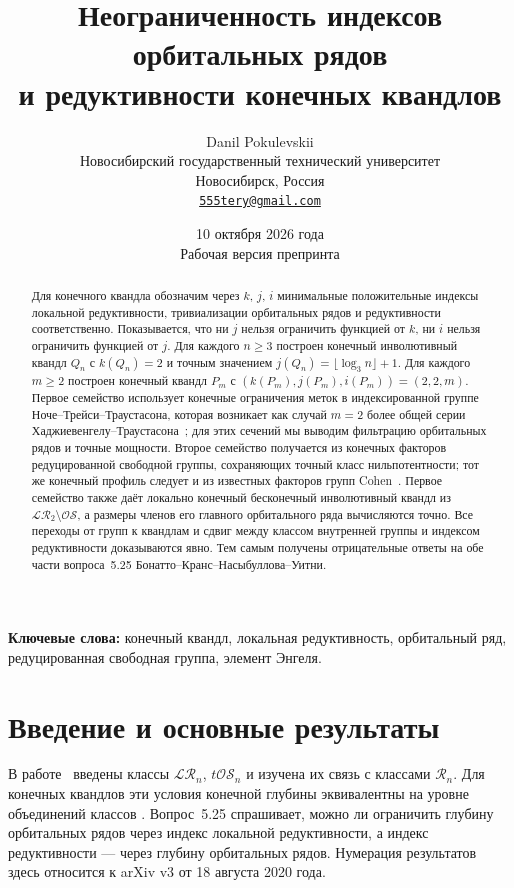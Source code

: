 \documentclass[11pt,a4paper]{article}
\title{Неограниченность индексов орбитальных рядов\\
и редуктивности конечных квандлов}
\author{Danil Pokulevskii\\[3pt]
  \small Новосибирский государственный технический университет\\
  \small Новосибирск, Россия\\
  \small\href{mailto:555tery@gmail.com}{\texttt{555tery@gmail.com}}}
\date{10 октября 2026 года\\[2pt]\small Рабочая версия препринта}
\theoremstyle{definition}
\theoremstyle{remark}
\newcommand{\R}{\mathcal R}
\newcommand{\LR}{\mathcal{LR}}
\newcommand{\tOS}{t\mathcal{OS}}
\begin{document}
\maketitle
\begin{abstract}
Для конечного квандла обозначим через \(k\), \(j\), \(i\)
минимальные положительные индексы локальной редуктивности,
тривиализации орбитальных рядов и редуктивности соответственно.
Показывается, что ни \(j\) нельзя ограничить функцией от \(k\),
ни \(i\) нельзя ограничить функцией от \(j\).
Для каждого \(n\ge3\) построен конечный инволютивный квандл \(Q_n\) с
\(k(Q_n)=2\) и точным значением \(j(Q_n)=\lfloor\log_3n\rfloor+1\).
Для каждого \(m\ge2\) построен конечный квандл \(P_m\) с
\((k(P_m),j(P_m),i(P_m))=(2,2,m)\).
Первое семейство использует конечные ограничения меток в индексированной
группе Ноче--Трейси--Траустасона, которая возникает как случай \(m=2\)
более общей серии Хаджиевенгелу--Траустасона~\cite{HT}; для этих сечений
мы выводим фильтрацию орбитальных рядов и точные мощности. Второе семейство
получается из конечных факторов редуцированной свободной группы,
сохраняющих точный класс нильпотентности; тот же конечный профиль следует
и из известных факторов групп Cohen~\cite{CMW}. Первое семейство также даёт локально конечный
бесконечный инволютивный квандл из
\(\mathcal{LR}_2\setminus\mathcal{OS}\), а размеры членов его главного
орбитального ряда вычисляются точно.
Все переходы от групп к квандлам
и сдвиг между классом внутренней группы и индексом редуктивности
доказываются явно. Тем самым получены отрицательные ответы
на обе части вопроса~5.25 Бонатто--Кранс--Насыбуллова--Уитни.
\end{abstract}

\noindent\textbf{Ключевые слова:} конечный квандл, локальная редуктивность,
орбитальный ряд, редуцированная свободная группа, элемент Энгеля.

\section{Введение и основные результаты}

В работе~\cite{BCNW} введены классы \(\LR_n\), \(\tOS_n\)
и изучена их связь с классами \(\R_n\).
Для конечных квандлов эти условия конечной глубины эквивалентны
на уровне объединений классов \cite[следствие~5.19]{BCNW}.
Вопрос~5.25 спрашивает, можно ли ограничить глубину орбитальных
рядов через индекс локальной редуктивности, а индекс редуктивности ---
через глубину орбитальных рядов.
Нумерация результатов~\cite{BCNW} здесь относится к
arXiv v3 от 18 августа 2020 года.
\end{document}
